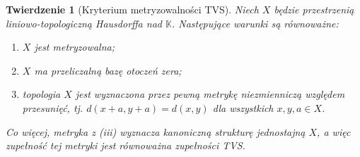 \documentclass[11pt,a4paper]{article}
\numberwithin{equation}{section}
\theoremstyle{plain}
\newtheorem{twierdzenie}{Twierdzenie}[section]
\theoremstyle{definition}
\theoremstyle{remark}
\newcommand{\K}{\mathbb K}
\begin{document}
\begin{twierdzenie}[Kryterium metryzowalności TVS]
\label{thm:tvs-metrizable}
Niech $X$ będzie przestrzenią liniowo-topologiczną
Hausdorffa nad $\K$. Następujące warunki są równoważne:
\begin{enumerate}[label=\textup{(\roman*)}]
\item $X$ jest metryzowalna;
\item $X$ ma przeliczalną bazę otoczeń zera;
\item topologia $X$ jest wyznaczona przez pewną
      metrykę niezmienniczą względem przesunięć,
      tj. $d(x+a,y+a)=d(x,y)$ dla wszystkich $x,y,a\in X$.
\end{enumerate}
Co więcej, metryka z (iii) wyznacza kanoniczną strukturę
jednostajną $X$, a więc zupełność tej metryki jest
równoważna zupełności TVS.
\end{twierdzenie}
\end{document}
